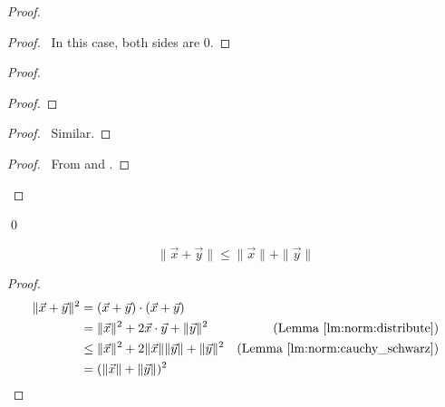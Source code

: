 \begin{proof}
  \pf
  \begin{proof}
    \pf\ In this case, both sides are 0.
  \end{proof}
  \begin{proof}
    \begin{proof}
    \end{proof}
    \begin{proof}
      \pf\ Similar.
    \end{proof}
    \begin{proof}
      \pf\ From  and .
    \end{proof}
  \end{proof}
  \qed
\end{proof}

\begin{lm}
  \label{lm:norm:triangle}
  \[ \| \vec{x} + \vec{y} \| \leq \| \vec{x} \| + \| \vec{y} \| \]
\end{lm}

\begin{proof}
  \pf
  \begin{align*}
    \| \vec{x} + \vec{y} \|^2 & = (\vec{x} + \vec{y}) \cdot (\vec{x} +
    \vec{y}) \\
    & = \| \vec{x} \| ^2 + 2 \vec{x} \cdot \vec{y} + \| \vec{y} \|^2 &
    (\text{Lemma \ref{lm:norm:distribute}}) \\
    & \leq \| \vec{x} \|^2 + 2 \| \vec{x} \| \| \vec{y} \| + \| \vec{y} \|^2
    &
    (\text{Lemma \ref{lm:norm:cauchy_schwarz}}) \\
    & = (\| \vec{x} \| + \| \vec{y} \|)^2 & \qed
  \end{align*}
\end{proof}

